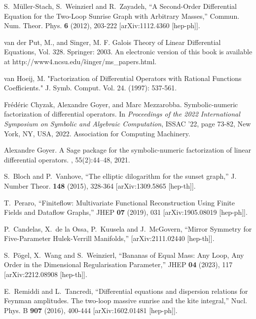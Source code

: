 \documentclass[a4paper,12pt]{article}
\numberwithin{equation}{section}
\numberwithin{figure}{section}
\begin{document}
\begin{thebibliography}{99}
S.~M\"uller-Stach, S.~Weinzierl and R.~Zayadeh,
``A Second-Order Differential Equation for the Two-Loop Sunrise Graph with Arbitrary Masses,''
Commun. Num. Theor. Phys. \textbf{6} (2012), 203-222
[arXiv:1112.4360 [hep-ph]].

  
 van der Put, M., and Singer, M. F. Galois Theory of Linear Differential Equations, Vol. 328. Springer: 2003. An electronic version of this book is available at http://www4.ncsu.edu/\~singer/ms\_papers.html.

  van Hoeij, M. "Factorization of Differential Operators with Rational Functions Coefficients." J. Symb. Comput. Vol. 24. (1997): 537-561.

Fr\'{e}d\'{e}ric Chyzak, Alexandre Goyer, and Marc Mezzarobba.
\newblock Symbolic-numeric factorization of differential operators.
\newblock In {\em Proceedings of the 2022 International Symposium on Symbolic
  and Algebraic Computation}, ISSAC '22, page 73-82, New York, NY, USA, 2022.
Association for Computing Machinery.
\newblock [arXiv:2205.08991]

Alexandre Goyer.
\newblock A {S}age package for the symbolic-numeric factorization of linear
  differential operators.
, 55(2):44--48,
2021.

S.~Bloch and P.~Vanhove,
``The elliptic dilogarithm for the sunset graph,''
J. Number Theor. \textbf{148} (2015), 328-364
[arXiv:1309.5865 [hep-th]].
  
T.~Peraro,
``Finiteflow: Multivariate Functional Reconstruction Using Finite Fields and Dataflow Graphs,''
JHEP \textbf{07} (2019), 031
[arXiv:1905.08019 [hep-ph]].

P.~Candelas, X.~de la Ossa, P.~Kuusela and J.~McGovern,
``Mirror Symmetry for Five-Parameter Hulek-Verrill Manifolds,''
[arXiv:2111.02440 [hep-th]].

S.~P\"ogel, X.~Wang and S.~Weinzierl,
``Bananas of Equal Mass: Any Loop, Any Order in the Dimensional Regularisation Parameter,''
JHEP \textbf{04} (2023), 117
[arXiv:2212.08908 [hep-th]].

 

E.~Remiddi and L.~Tancredi,
``Differential equations and dispersion relations for Feynman amplitudes. The two-loop massive sunrise and the kite integral,''
Nucl. Phys. B \textbf{907} (2016), 400-444
[arXiv:1602.01481 [hep-ph]].


\end{thebibliography}
\end{document}
